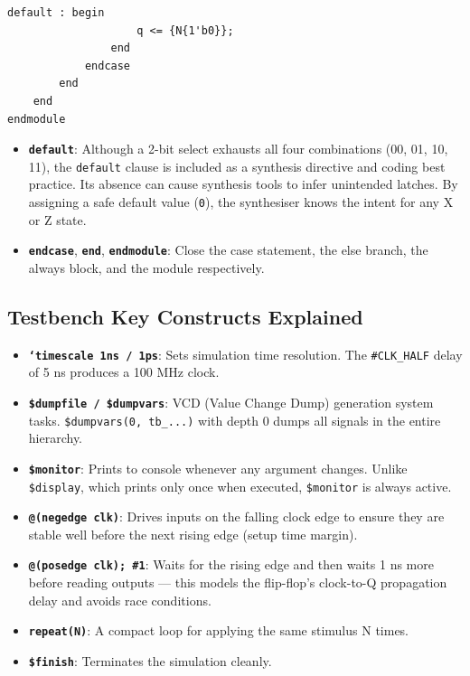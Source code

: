 \documentclass[12pt,a4paper]{report}
\begin{document}
\begin{lstlisting}[firstnumber=47, caption={Default case and module termination}]
                default : begin
                    q <= {N{1'b0}};
                end
            endcase
        end
    end
endmodule
\end{lstlisting}

\begin{itemize}
    \item \textbf{\texttt{default}}: Although a 2-bit select exhausts all four combinations (00, 01, 10, 11), the \texttt{default} clause is included as a synthesis directive and coding best practice. Its absence can cause synthesis tools to infer unintended latches. By assigning a safe default value (\texttt{0}), the synthesiser knows the intent for any X or Z state.
    \item \textbf{\texttt{endcase}}, \textbf{\texttt{end}}, \textbf{\texttt{endmodule}}: Close the case statement, the else branch, the always block, and the module respectively.
\end{itemize}

\subsection{Testbench Key Constructs Explained}

\begin{itemize}
    \item \textbf{\texttt{`timescale 1ns / 1ps}}: Sets simulation time resolution. The \texttt{\#CLK\_HALF} delay of 5 ns produces a 100 MHz clock.
    \item \textbf{\texttt{\$dumpfile / \$dumpvars}}: VCD (Value Change Dump) generation system tasks. \texttt{\$dumpvars(0, tb\_...)} with depth 0 dumps all signals in the entire hierarchy.
    \item \textbf{\texttt{\$monitor}}: Prints to console whenever any argument changes. Unlike \texttt{\$display}, which prints only once when executed, \texttt{\$monitor} is always active.
    \item \textbf{\texttt{@(negedge clk)}}: Drives inputs on the falling clock edge to ensure they are stable well before the next rising edge (setup time margin).
    \item \textbf{\texttt{@(posedge clk); \#1}}: Waits for the rising edge and then waits 1 ns more before reading outputs — this models the flip-flop's clock-to-Q propagation delay and avoids race conditions.
    \item \textbf{\texttt{repeat(N)}}: A compact loop for applying the same stimulus N times.
    \item \textbf{\texttt{\$finish}}: Terminates the simulation cleanly.
\end{itemize}
\end{document}

